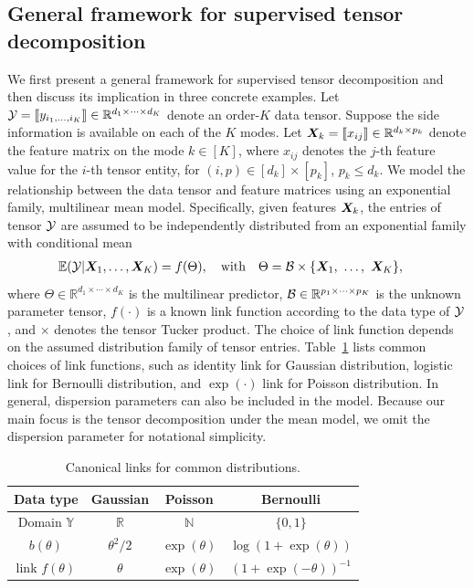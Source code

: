 \documentclass[12pt]{article}
\theoremstyle{plain}
\theoremstyle{definition}
\begin{document}
\subsection{General framework for supervised tensor decomposition}
We first present a general framework for supervised tensor decomposition and then discuss its implication in three concrete examples. Let $\mathcal{Y}=\llbracket y_{i_1,\ldots,i_K} \rrbracket\in\mathbb{R}^{d_1\times \cdots\times d_K}$ denote an order-$K$ data tensor. Suppose the side information is available on each of the $K$ modes. Let $\bm X_k=\llbracket x_{ij} \rrbracket\in\mathbb{R}^{d_k\times p_k}$ denote the feature matrix on the mode $k\in[K]$, where $x_{ij}$ denotes the $j$-th feature value for the $i$-th tensor entity, for $(i,p)\in[d_k]\times[p_k]$, $p_k\leq d_k$. We model the relationship between the data tensor and feature matrices using an exponential family, multilinear mean model. Specifically, given features $\bm X_k$, the entries of tensor $\mathcal{Y}$ are assumed to be independently distributed from an exponential family with conditional mean
\begin{align}\label{eq:tensormodel}
&\mathbb{E}(\mathcal{Y}|\bm X_1,\ldots,\bm X_K)=f(\Theta),\quad \text{with}\quad \Theta =\mathcal{B}\times\{\bm X_1,\ \ldots,\ \bm X_K\} ,
\end{align}
where $\Theta\in\mathbb{R}^{d_1\times \cdots\times d_K}$ is the multilinear predictor, $\mathcal{B}\in\mathbb{R}^{p_1\times \cdots \times p_K}$ is the unknown parameter tensor, $f(\cdot)$ is a known link function according to the data type of $\mathcal{Y}$, and $\times$ denotes the tensor Tucker product. The choice of link function depends on the assumed distribution family of tensor entries. Table~\ref{table:link} lists common choices of link functions, such as identity link for Gaussian distribution, logistic link for Bernoulli distribution, and $\exp(\cdot)$ link for Poisson distribution. In general, dispersion parameters can also be included in the model. Because our main focus is the tensor decomposition under the mean model, we omit the dispersion parameter for notational simplicity. 
\begin{table}[htb]
\centering
\begin{tabular}{c|ccc}
Data type &Gaussian & Poisson& Bernoulli\\
\hline
Domain $\mathbb{Y}$& $\mathbb{R}$&$\mathbb{N}$&$\{0,1\}$\\
 $b(\theta)$&$\theta^2/2$& $\exp(\theta)$&$\log (1+\exp(\theta))$\\
 link $f(\theta)$&$\theta$&$\exp(\theta)$&$(1+\exp(-\theta))^{-1}$
\end{tabular}
\caption{Canonical links for common distributions.}\label{table:link}
\end{table}
\end{document}
